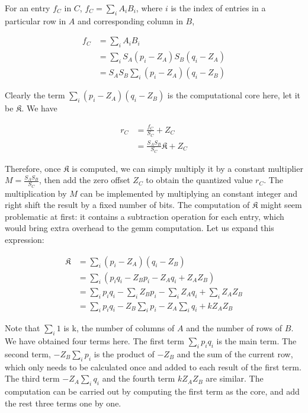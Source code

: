 For an entry $f_C$ in $C$, $f_C = \sum_{i}^{} A_i B_i$, where $i$ is the index of entries in a particular
row in $A$ and corresponding column in $B$,

\begin{equation}
\begin{split}
  f_C & = \sum_{i} A_i B_i \\
      & = \sum_{i} S_A (p_i - Z_A) S_B (q_i - Z_A) \\
      & = S_A S_B \sum_{i} (p_i - Z_A) (q_i - Z_B)
\end{split}
\end{equation}

Clearly the term $\sum_{i} (p_i - Z_A) (q_i - Z_B)$ is the computational core here, let it be
$\mathfrak{K}$. We have

\begin{equation}
\begin{split}
  r_C & = \frac{f_C}{S_C} + Z_C \\
      & = \frac{S_A S_B}{S_C} \mathfrak{K} + Z_C
\end{split}
\end{equation}

Therefore, once $\mathfrak{K}$ is computed, we can simply multiply it by a constant multiplier
$M = \frac{S_A S_B}{S_C}$, then add the zero offset $Z_C$ to obtain the quantized value $r_C$. The
multiplication by $M$ can be implemented by multiplying an constant integer and right shift the
result by a fixed number of bits. The computation of $\mathfrak{K}$ might seem problematic at first:
it contains a subtraction operation for each entry,
which would bring extra overhead to the \gls{gemm} computation. Let us expand this expression:

\begin{equation}
\begin{split}
  \mathfrak{K} & = \sum_{i} (p_i - Z_A) (q_i - Z_B) \\
               & = \sum_{i} (p_i q_i - Z_B p_i - Z_A q_i + Z_A Z_B) \\
               & = \sum_{i} p_i q_i - \sum_{i} Z_B p_i - \sum_{i} Z_A q_i + \sum_{i} Z_A Z_B \\
               & = \sum_{i} p_i q_i - Z_B \sum_{i} p_i - Z_A \sum_{i} q_i + k Z_A Z_B
\end{split}
\end{equation}

Note that $\sum_{i} 1$ is k, the number of columns of $A$ and the number of rows of $B$. We have obtained
four terms here. The first term $\sum_{i} p_i q_i$ is the main term. The second term, $- Z_B \sum_{i} p_i$
is the product of $- Z_B$ and the sum of the current row, which only needs to be calculated once and added
to each result of the first term. The third term $- Z_A \sum_{i} q_i$ and the fourth term $k Z_A Z_B$ are
similar. The computation can be carried out by computing the first term as the core, and add the rest three
terms one by one.

